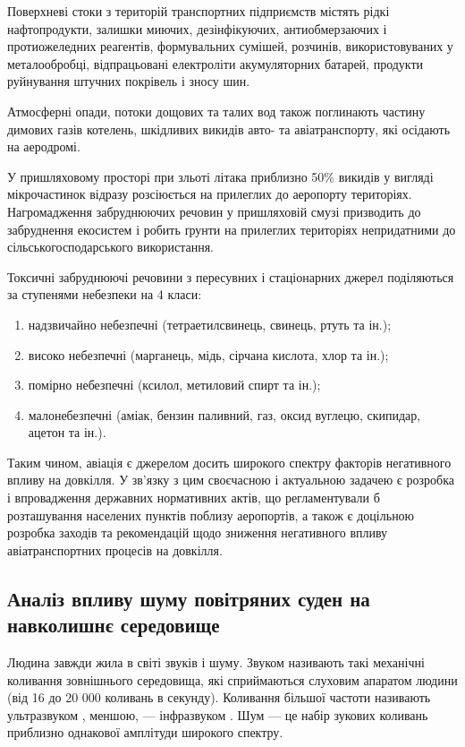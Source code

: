 Поверхневі стоки з територій транспортних підприємств містять рідкі нафтопродукти, залишки миючих, дезінфікуючих, антиобмерзаючих і протиожеледних реагентів, формувальних сумішей, розчинів, використовуваних у металообробці, відпрацьовані електроліти акумуляторних батарей, продукти руйнування штучних покрівель і зносу шин. 

Атмосферні опади, потоки дощових та талих вод також поглинають частину димових газів котелень, шкідливих викидів авто- та авіатранспорту, які осідають на аеродромі. 

У пришляховому просторі при зльоті літака приблизно 50\% викидів у вигляді мікрочастинок відразу розсіюється на прилеглих до аеропорту територіях. Нагромадження забруднюючих речовин у пришляховій смузі призводить до забруднення екосистем і робить ґрунти на прилеглих територіях непридатними до сільськогосподарського використання. 

Токсичні забруднюючі речовини з пересувних і стаціонарних джерел поділяються за ступенями небезпеки на 4 класи: 
\begin{enumerate}
 \item надзвичайно небезпечні (тетраетилсвинець, свинець, ртуть та ін.); 
 \item високо небезпечні (марганець, мідь, сірчана кислота, хлор та ін.); 
 \item помірно небезпечні (ксилол, метиловий спирт та ін.); 
 \item малонебезпечні (аміак, бензин паливний, газ, оксид вуглецю, скипидар, ацетон та ін.).
\end{enumerate}

Таким чином, авіація є джерелом досить широкого спектру факторів негативного впливу на довкілля. У зв’язку з цим своєчасною і актуальною задачею є розробка і впровадження державних нормативних актів, що регламентували б розташування населених пунктів поблизу аеропортів, а також є доцільною розробка заходів та рекомендацій щодо зниження негативного впливу авіатранспортних процесів на довкілля.

\subsection{Аналіз впливу шуму повітряних суден на навколишнє середовище}

Людина завжди жила в світі звуків і шуму. Звуком називають такі механічні коливання зовнішнього середовища, які сприймаються слуховим апаратом людини (від 16 до 20 000 коливань в секунду). Коливання більшої частоти називають ультразвуком , меншою, --- інфразвуком . Шум --- це набір зукових коливань приблизно однакової амплітуди широкого спектру. 

